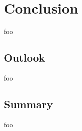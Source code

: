 \documentclass[report.tex]{subfiles}
\begin{document}
\section{Conclusion}
\label{sec:conclusion}

foo

\subsection{Outlook}

foo

\subsection{Summary}

foo
\end{document}
